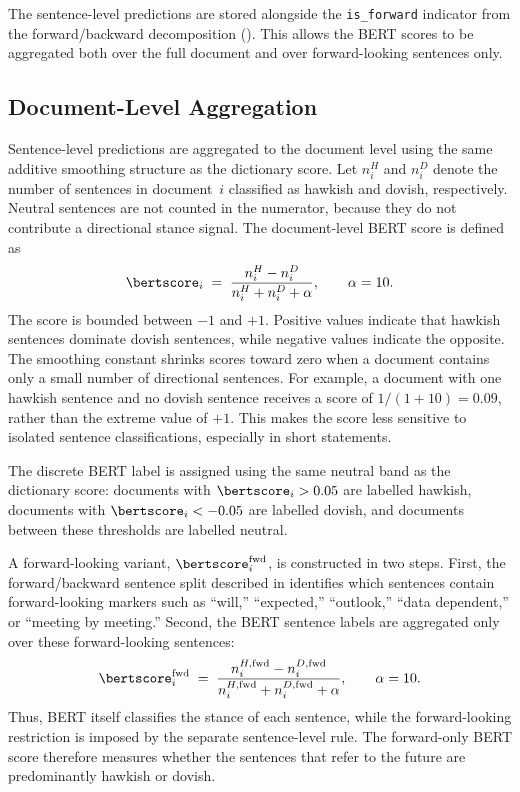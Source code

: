 The sentence-level predictions are stored alongside the
\texttt{is\_forward} indicator from the forward/backward decomposition
(). This allows the BERT scores to be aggregated
both over the full document and over forward-looking sentences only.

\subsection{Document-Level Aggregation}

Sentence-level predictions are aggregated to the document level using
the same additive smoothing structure as the dictionary score. Let
$n^H_i$ and $n^D_i$ denote the number of sentences in document~$i$
classified as hawkish and dovish, respectively. Neutral sentences are
not counted in the numerator, because they do not contribute a
directional stance signal. The document-level BERT score is defined as
%
\begin{equation}
\label{eq:bertscore}
\bertscore_i \;=\;
  \frac{n^H_i - n^D_i}{n^H_i + n^D_i + \alpha},
  \qquad \alpha = 10.
\end{equation}
%
The score is bounded between $-1$ and $+1$. Positive values indicate
that hawkish sentences dominate dovish sentences, while negative values
indicate the opposite. The smoothing constant shrinks scores toward
zero when a document contains only a small number of directional
sentences. For example, a document with one hawkish sentence and no
dovish sentence receives a score of $1/(1+10)=0.09$, rather than the
extreme value of $+1$. This makes the score less sensitive to isolated
sentence classifications, especially in short statements.

The discrete BERT label is assigned using the same neutral band as the
dictionary score: documents with $\bertscore_i > 0.05$ are labelled
hawkish, documents with $\bertscore_i < -0.05$ are labelled dovish, and
documents between these thresholds are labelled neutral.

A forward-looking variant, $\bertscore^{\text{fwd}}_i$, is constructed
in two steps. First, the forward/backward sentence split described in
 identifies which sentences contain
forward-looking markers such as ``will,'' ``expected,'' ``outlook,''
``data dependent,'' or ``meeting by meeting.'' Second, the BERT
sentence labels are aggregated only over these forward-looking
sentences:
%
\begin{equation}
\label{eq:bertscore_fwd}
\bertscore^{\text{fwd}}_i \;=\;
  \frac{n^{H,\text{fwd}}_i - n^{D,\text{fwd}}_i}
       {n^{H,\text{fwd}}_i + n^{D,\text{fwd}}_i + \alpha},
  \qquad \alpha = 10.
\end{equation}
%
Thus, BERT itself classifies the stance of each sentence, while the
forward-looking restriction is imposed by the separate sentence-level
rule. The forward-only BERT score therefore measures whether the
sentences that refer to the future are predominantly hawkish or dovish.

